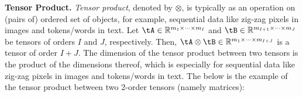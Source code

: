 \textbf{Tensor Product.} 
\textit{Tensor product}, denoted by $ \otimes $, is typically as an operation on (pairs of) ordered set of objects, for example, sequential data like zig-zag pixels in images and tokens/words in text. Let $\tA \in \mathbb{R}^{m_{1}\times\cdots\times m_{I}}$ and $\tB \in \mathbb{R}^{m_{I+1}\times\cdots\times m_{J}}$ be tensors of orders $I$ and $J$, respectively. Then, $\tA \otimes \tB \in \mathbb{R}^{m_{1}\times\cdots\times m_{I+J}}$ is a tensor of order ${I+J}$.
The dimension of the tensor product between two tensors is  the product of the dimensions thereof, which is especially for sequential data like zig-zag pixels in images and tokens/words in text. 
The below is the example of the tensor product between two 2-order tensors (namely matrices):
